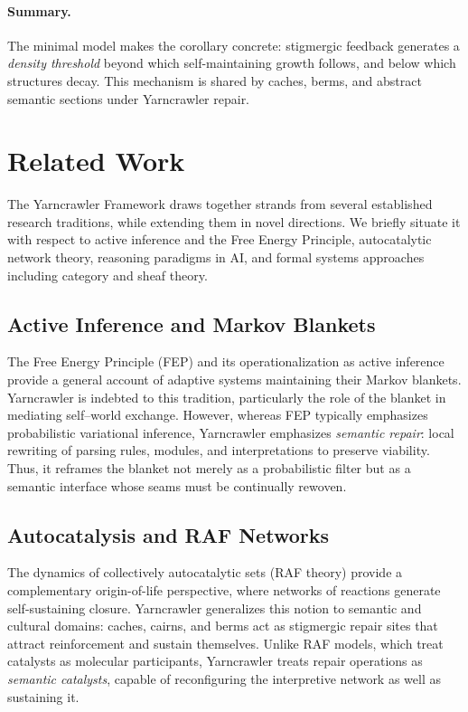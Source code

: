 \documentclass{article}
\begin{document}
\paragraph{Summary.}
The minimal model makes the corollary concrete: stigmergic feedback generates a
\emph{density threshold} beyond which self-maintaining growth follows, and below which structures decay.
This mechanism is shared by caches, berms, and abstract semantic sections under Yarncrawler repair.

\section{Related Work}

The Yarncrawler Framework draws together strands from several established research traditions, while extending them in novel directions. We briefly situate it with respect to active inference and the Free Energy Principle, autocatalytic network theory, reasoning paradigms in AI, and formal systems approaches including category and sheaf theory.

\subsection{Active Inference and Markov Blankets}
The Free Energy Principle (FEP) and its operationalization as active inference \citep{friston2010free,friston2019free} provide a general account of adaptive systems maintaining their Markov blankets. 
Yarncrawler is indebted to this tradition, particularly the role of the blanket in mediating self–world exchange. 
However, whereas FEP typically emphasizes probabilistic variational inference, Yarncrawler emphasizes \emph{semantic repair}: local rewriting of parsing rules, modules, and interpretations to preserve viability. 
Thus, it reframes the blanket not merely as a probabilistic filter but as a semantic interface whose seams must be continually rewoven.

\subsection{Autocatalysis and RAF Networks}
The dynamics of collectively autocatalytic sets (RAF theory) \citep{hordijk2019raf} provide a complementary origin-of-life perspective, where networks of reactions generate self-sustaining closure. 
Yarncrawler generalizes this notion to semantic and cultural domains: caches, cairns, and berms act as stigmergic repair sites that attract reinforcement and sustain themselves. 
Unlike RAF models, which treat catalysts as molecular participants, Yarncrawler treats repair operations as \emph{semantic catalysts}, capable of reconfiguring the interpretive network as well as sustaining it.
\end{document}
